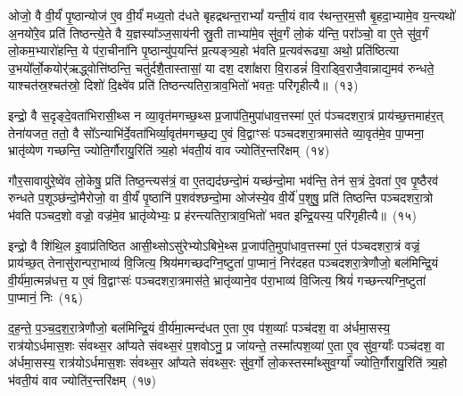 ओजो॒ वै वी॒र्यं॑ पृ॒ष्ठान्योज॑ ए॒व वी॒र्यं॑ मध्य॒तो द॑धते बृहद्रथन्त॒रा\-भ्यां᳚ यन्ती॒यं वाव र॑थन्त॒रम॒सौ बृ॒हदा॒भ्यामे॒व य॒न्त्यथो॑ अ॒नयो॑रे॒व प्रति॑ तिष्ठन्त्ये॒ते वै य॒ज्ञस्या᳚ञ्ज॒साय॑नी स्रु॒ती ताभ्या॑मे॒व सु॑व॒र्गं लो॒कं य॑न्ति॒ परा᳚ञ्चो॒ वा ए॒ते सु॑व॒र्गं लो॒कम॒भ्यारो॑हन्ति॒ ये प॑रा॒चीना॑नि पृ॒ष्ठान्यु॑प॒यन्ति॑ प्र॒त्यङ्त्र्य॒हो भ॑वति प्र॒त्यव॑रूढ्या॒ अथो॒ प्रति॑ष्ठित्या उ॒भयो᳚र्लो॒कयोर्॑\mbox{}॑ऋद्ध्वोत्ति॑ष्ठन्ति॒ चतु॑र्दशै॒तास्तासां॒ या दश॒ दशा᳚क्षरा वि॒राडन्नं॑ वि॒राड्वि॒राजै॒वान्नाद्य॒मव॑ रुन्धते॒ याश्चत॑स्र॒श्चत॑स्रो॒ दिशो॑ दि॒क्ष्वे॑व प्रति॑ तिष्ठन्त्यतिरा॒त्राव॒भितो॑ भवतः॒ परि॑गृहीत्यै॥~(१३)\ip

{\anuvakamend[{आर्ध्नु॑वन्त्र्य॒हाभ्या॑म॒स्मिन्थ्स॑विवध॒त्वाय॒ प्रति॑ष्ठित्या॒ एक॑त्रिꣳशच्च}]}

इन्द्रो॒ वै स॒दृङ्दे॒वता॑भिरासी॒थ्स न व्या॒वृत॑मगच्छ॒थ्स प्र॒जा\-प॑ति॒मुपा॑धाव॒त्तस्मा॑ ए॒तं प॑ञ्चदशरा॒त्रं प्राय॑च्छ॒त्तमाह॑र॒त् तेना॑यजत॒ ततो॒ वै सो᳚\-ऽन्याभि॑र्दे॒वता॑भिर्व्या॒वृत॑मगच्छ॒द्य ए॒वं वि॒द्वाꣳसः॑ पञ्चदशरा॒त्रमास॑ते व्या॒वृत॑मे॒व पा॒प्मना॒ भ्रातृ॑व्येण गच्छन्ति॒ ज्योति॒र्गौरायु॒रिति॑ त्र्य॒हो भ॑वती॒यं वाव ज्योति॑र॒न्तरि॑क्षम्~(१४)\ip

गौर॒सावायु॑रे॒ष्वे॑व लो॒केषु॒ प्रति॑ तिष्ठ॒न्त्यस॑त्रं॒ वा ए॒तद्यद॑छन्दो॒मं यच्छ॑न्दो॒मा भव॑न्ति॒ तेन॑ स॒त्रं दे॒वता॑ ए॒व पृ॒ष्ठैरव॑ रुन्धते प॒शूञ्छ॑न्दो॒मैरोजो॒ वा वी॒र्यं॑ पृ॒ष्ठानि॑ प॒शव॑श्छन्दो॒मा ओज॑स्ये॒व वी॒र्ये॑ प॒शुषु॒ प्रति॑ तिष्ठन्ति पञ्चदशरा॒त्रो भ॑वति पञ्चद॒शो वज्रो॒ वज्र॑मे॒व भ्रातृ॑व्येभ्यः॒ प्र ह॑रन्त्यतिरा॒त्राव॒भितो॑ भवत इन्द्रि॒यस्य॒ परि॑गृहीत्यै॥~(१५)\ip

{\anuvakamend[{अ॒न्तरि॑क्षमिन्द्रि॒यस्यैक॑ञ्च}]}

इन्द्रो॒ वै शि॑थि॒ल इ॒वाप्र॑तिष्ठित आसी॒थ्सो\-ऽसु॑रेभ्यो\-ऽबिभे॒थ्स प्र॒जा\-प॑ति॒मुपा॑धाव॒त्तस्मा॑ ए॒तं प॑ञ्चदशरा॒त्रं वज्रं॒ प्राय॑च्छ॒त् तेनासु॑रान्परा॒भाव्य॑ वि॒जित्य॒ श्रिय॑मगच्छदग्नि॒ष्टुता॑ पा॒प्मानं॒ निर॑दहत पञ्चदशरा॒त्रेणौजो॒ बल॑मिन्द्रि॒यं वी॒र्य॑मा॒त्मन्न॑धत्त॒ य ए॒वं वि॒द्वाꣳसः॑ पञ्चदशरा॒त्रमास॑ते॒ भ्रातृ॑व्याने॒व प॑रा॒भाव्य॑ वि॒जित्य॒ श्रियं॑ गच्छन्त्यग्नि॒ष्टुता॑ पा॒प्मानं॒ निः~(१६)\ip

द॒ह॒न्ते॒ प॒ञ्च॒द॒श॒रा॒त्रेणौजो॒ बल॑मिन्द्रि॒यं वी॒र्य॑मा॒त्मन्द॑धत ए॒ता ए॒व प॑श॒व्याः᳚ पञ्च॑दश॒ वा अ॑र्धमा॒सस्य॒ रात्र॑यो\-ऽ\-र्धमास॒शः सं॑वथ्स॒र आ᳚प्यते संवथ्स॒रं प॒शवो\-ऽनु॒ प्र जा॑यन्ते॒ तस्मा᳚त्पश॒व्या॑ ए॒ता ए॒व सु॑व॒र्ग्याः᳚ पञ्च॑दश॒ वा अ॑र्धमा॒सस्य॒ रात्र॑यो\-ऽर्धमास॒शः सं॑वथ्स॒र आ᳚प्यते संवथ्स॒रः सु॑व॒र्गो लो॒कस्तस्मा᳚थ्सुव॒र्ग्या᳚ ज्योति॒र्गौरायु॒रिति॑ त्र्य॒हो भ॑वती॒यं वाव ज्योति॑र॒न्तरि॑क्षम्~(१७)\ip

